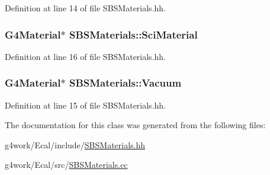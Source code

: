 Definition at line 14 of file S\-B\-S\-Materials.\-hh.

\hypertarget{class_s_b_s_materials_aff3bcb06f66c199df9ef74ee7528d211}{
\subsubsection[{Sci\-Material}]{\setlength{\rightskip}{0pt plus 5cm}G4\-Material$\ast$ S\-B\-S\-Materials\-::\-Sci\-Material}}\label{class_s_b_s_materials_aff3bcb06f66c199df9ef74ee7528d211}


Definition at line 16 of file S\-B\-S\-Materials.\-hh.

\hypertarget{class_s_b_s_materials_ae273503caa4dd4f4d4cd8787d480faf4}{
\subsubsection[{Vacuum}]{\setlength{\rightskip}{0pt plus 5cm}G4\-Material$\ast$ S\-B\-S\-Materials\-::\-Vacuum}}\label{class_s_b_s_materials_ae273503caa4dd4f4d4cd8787d480faf4}


Definition at line 15 of file S\-B\-S\-Materials.\-hh.



The documentation for this class was generated from the following files\-:\begin{DoxyCompactItemize}
\item 
g4work/\-Ecal/include/\hyperlink{_s_b_s_materials_8hh}{S\-B\-S\-Materials.\-hh}\item 
g4work/\-Ecal/src/\hyperlink{_s_b_s_materials_8cc}{S\-B\-S\-Materials.\-cc}\end{DoxyCompactItemize}
